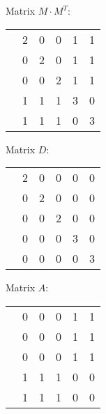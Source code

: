 \documentclass[12pt,letterpaper]{article}
\begin{document}
Matrix $M\cdot M^T$:
\begin{flushright}
\begin{tabular}{|*{6}{c|}}
      \hline
      &   &   &   &   &  \\
      \hline
      & 2 & 0 & 0 & 1 & 1\\
      \hline
      & 0 & 2 & 0 & 1 & 1\\
      \hline
      & 0 & 0 & 2 & 1 & 1\\
      \hline
      & 1 & 1 & 1 & 3 & 0\\
      \hline
      & 1 & 1 & 1 & 0 & 3\\
      \hline
\end{tabular}


Matrix $D$:
\begin{tabular}{|*{6}{c|}}
      \hline
      &   &   &   &   &  \\
      \hline
      & 2 & 0 & 0 & 0 & 0\\
      \hline
      & 0 & 2 & 0 & 0 & 0\\
      \hline
      & 0 & 0 & 2 & 0 & 0\\
      \hline
      & 0 & 0 & 0 & 3 & 0\\
      \hline
      & 0 & 0 & 0 & 0 & 3\\
      \hline
\end{tabular}
\end{flushright}


Matrix $A$:
\begin{flushright}
\begin{tabular}{|*{6}{c|}}
      \hline
      &   &   &   &   &  \\
      \hline
      & 0 & 0 & 0 & 1 & 1\\
      \hline
      & 0 & 0 & 0 & 1 & 1\\
      \hline
      & 0 & 0 & 0 & 1 & 1\\
      \hline
      & 1 & 1 & 1 & 0 & 0\\
      \hline
      & 1 & 1 & 1 & 0 & 0\\
      \hline
\end{tabular}
\end{flushright}
\end{document}
